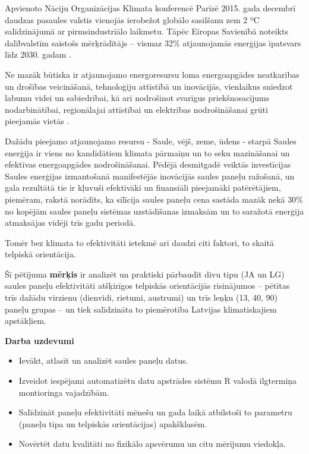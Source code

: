 Apvienoto Nāciju Organizācijas Klimata konferencē Parīzē 2015. gada decembrī daudzas pasaules valstis vienojās ierobežot globālo sasilšanu zem 2 ºC salīdzinājumā ar pirmsindustriālo laikmetu.
Tāpēc Eiropas Savienībā noteikts dalībvalstīm saistošs mērķrādītājs  –  vismaz 32\%  atjaunojamās enerģijas īpatsvars līdz 2030. gadam \cite{ES}.

Ne mazāk būtiska ir atjaunojamo energoresursu loma energoapgādes neatkarības un drošības veicināšanā, tehnoloģiju attīstībā un inovācijās, vienlaikus sniedzot labumu videi un sabiedrībai, kā arī nodrošinot svarīgus priekšnosacījums nodarbinātībai, reģionālajai attīstībai un elektrības nodrošināšanai grūti pieejamās vietās \cite{ES}.

Dažādu pieejamo atjaunojamo resursu - Saule, vējš, zeme, ūdens - starpā Saules enerģija ir viens no kandidātiem klimata pārmaiņu un to seku mazināšanai un efektīvas energoapgādes nodrošināšanai. Pēdējā desmitgadē veiktās investīcijas Saules enerģijas izmantošanā manifestējās inovācijās saules paneļu ražošanā, un gala rezultātā tie ir kļuvuši efektīvāki un finansiāli pieejamāki patērētājiem, piemēram, rakstā \cite{researchOpp} norādīts, ka silīcija saules paneļu cena sastāda mazāk nekā 30\% no kopējām saules paneļu sistēmas uzstādīšanas izmaksām un to saražotā enerģija atmaksājas vidēji trīs gadu periodā.

Tomēr bez klimata to efektivitāti ietekmē arī daudzi citi faktori, to skaitā telpiskā orientācija.

Šī pētījuma \textbf{mērķis} ir analizēt un praktiski pārbaudīt divu tipu (JA un LG) saules paneļu efektivitāti atšķirīgos telpiskās orientācijās risinājumos -- pētītas trīs dažādu virzienu (dienvidi, rietumi, austrumi) un trīs leņķu (13, 40, 90) paneļu grupas -- un tiek salīdzināta to piemērotība Latvijas klimatiskajiem apstākļiem.

\textbf{Darba uzdevumi}
\begin{itemize}
\item Ievākt, atlasīt un analizēt saules paneļu datus.
\item Izveidot iespējami automatizētu datu apstrādes sistēmu R valodā ilgtermiņa montioringa vajadzībām.
\item Salīdzināt paneļu efektivitāti mēnešu un gada laikā atbilstoši to parametru (paneļu tipa un telpiskās orientācijas) apakšklasēm.
\item Novērtēt datu kvalitāti no fizikālo apsvērumu un citu mērījumu viedokļa.
\end{itemize}

